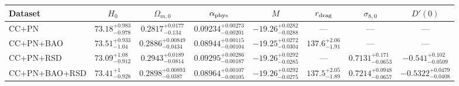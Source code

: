 \begin{tabular}{lccccccc}
\hline
Dataset & $H_0$ & $\Omega_{m,0}$ & $\alpha_{\rm phys}$ & $M$ & $r_{\rm drag}$ & $\sigma_{8,0}$ & $D'(0)$ \\
\hline
CC+PN & $73.18^{+0.983}_{-0.978}$ & $0.2817^{+0.0177}_{-0.134}$ & $0.09234^{+0.00273}_{-0.00201}$ & $-19.26^{+0.0282}_{-0.0288}$ & — & — & — \\
CC+PN+BAO & $73.51^{+0.933}_{-1.04}$ & $0.2886^{+0.00849}_{-0.0434}$ & $0.08944^{+0.00115}_{-0.00104}$ & $-19.25^{+0.0272}_{-0.0304}$ & $137.6^{+2.06}_{-1.91}$ & — & — \\
CC+PN+RSD & $73.09^{+1.08}_{-0.912}$ & $0.2943^{+0.0189}_{-0.0814}$ & $0.09295^{+0.00286}_{-0.00187}$ & $-19.26^{+0.0292}_{-0.0285}$ & — & $0.7131^{+0.171}_{-0.0653}$ & $-0.541^{+0.102}_{-0.0509}$ \\
CC+PN+BAO+RSD & $73.41^{+1}_{-0.928}$ & $0.2898^{+0.00893}_{-0.0387}$ & $0.08964^{+0.00107}_{-0.00105}$ & $-19.26^{+0.0292}_{-0.0275}$ & $137.5^{+2.05}_{-1.89}$ & $0.7214^{+0.0948}_{-0.0657}$ & $-0.5322^{+0.0479}_{-0.0408}$ \\
\hline
\end{tabular}
